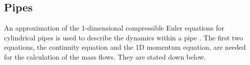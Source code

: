 




\subsection{Pipes}\label{sec::pipes}
An approximation of the 1-dimensional compressible Euler equations for cylindrical pipes is used to describe the dynamics within a pipe \cite{Krug2020}. The first two equations, the continuity equation and the 1D momentum equation, are needed for the calculation of the mass flows. They are stated down below.

